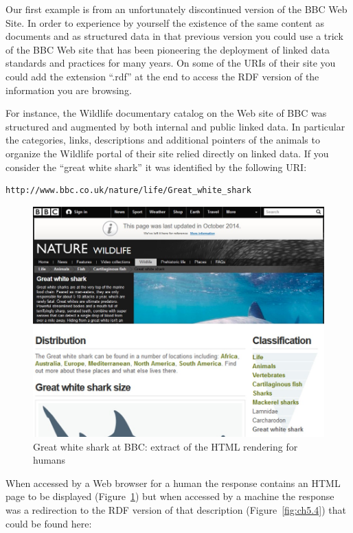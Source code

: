 Our first example is from an unfortunately discontinued version of the
BBC Web Site. In order to experience by yourself the existence of the
same content as documents and as structured data in that previous
version you could use a trick of the BBC Web site that has been
pioneering the deployment of linked data standards and practices for
many years. On some of the URIs of their site you could add the
extension ``.rdf'' at the end to access the RDF version of the
information you are browsing.

For instance, the Wildlife documentary catalog on the Web site of BBC
was structured and augmented by both internal and public linked data. In
particular the categories, links, descriptions and additional pointers
of the animals to organize the Wildlife portal of their site relied
directly on linked data. If you consider the ``great white shark'' it
was identified by the following URI:

\begin{lstlisting}
http://www.bbc.co.uk/nature/life/Great_white_shark
\end{lstlisting}

\begin{figure}
    \centering
     \includegraphics[width=5.0in]{media/ch5/figure-05-03.jpg}
    \caption{Great white shark at BBC: extract of the HTML rendering for
humans}
    \label{fig:ch5.3}
\end{figure}


When accessed by a Web browser for a human the response contains an HTML
page to be displayed (Figure~\ref{fig:ch5.3}) but when accessed by a machine the
response was a redirection to the RDF version of that description
(Figure~\ref{fig:ch5.4}) that could be found here:



